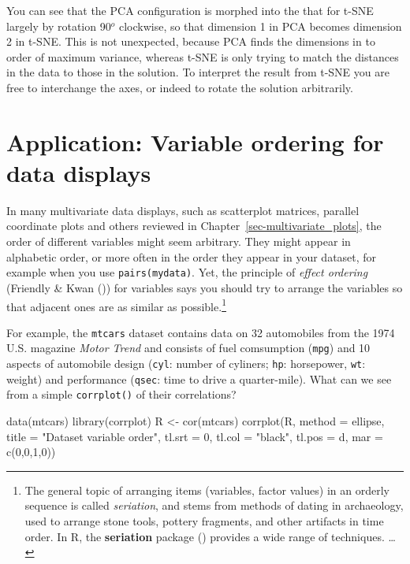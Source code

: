 \documentclass[
  letterpaper,
  10pt,
  krantz2]{krantz}
\makeatletter
\newenvironment{Shaded}{\begin{snugshade}}{\end{snugshade}}
\newcommand{\AttributeTok}[1]{\textcolor[rgb]{0.40,0.45,0.13}{#1}}
\newcommand{\DecValTok}[1]{\textcolor[rgb]{0.68,0.00,0.00}{#1}}
\newcommand{\FunctionTok}[1]{\textcolor[rgb]{0.28,0.35,0.67}{#1}}
\newcommand{\NormalTok}[1]{\textcolor[rgb]{0.00,0.23,0.31}{#1}}
\newcommand{\OtherTok}[1]{\textcolor[rgb]{0.00,0.23,0.31}{#1}}
\newcommand{\StringTok}[1]{\textcolor[rgb]{0.13,0.47,0.30}{#1}}
\newenvironment{kframe}{%
  \medskip{}
  \setlength{\fboxsep}{.8em}
  \def\at@end@of@kframe{}%
  \ifinner\ifhmode%
  \def\at@end@of@kframe{\end{minipage}}%
  \begin{minipage}{\columnwidth}%
  \fi\fi%
  \def\FrameCommand##1{\hskip\@totalleftmargin \hskip-\fboxsep
  \colorbox{shadecolor}{##1}\hskip-\fboxsep
      \hskip-\linewidth \hskip-\@totalleftmargin \hskip\columnwidth}%
  \MakeFramed {\advance\hsize-\width
    \@totalleftmargin\z@ \linewidth\hsize
    \@setminipage}}%
{\par\unskip\endMakeFramed%
  \at@end@of@kframe}
\renewenvironment{Shaded}{\begin{kframe}}{\end{kframe}}
\makeatother
\begin{document}
You can see that the PCA configuration is morphed into the that for
t-SNE largely by rotation 90\(^o\) clockwise, so that dimension 1 in PCA
becomes dimension 2 in t-SNE. This is not unexpected, because PCA finds
the dimensions in to order of maximum variance, whereas t-SNE is only
trying to match the distances in the data to those in the solution. To
interpret the result from t-SNE you are free to interchange the axes, or
indeed to rotate the solution arbitrarily.

\section{Application: Variable ordering for data
displays}\label{sec-var-order}

In many multivariate data displays, such as scatterplot matrices,
parallel coordinate plots and others reviewed in
Chapter~\ref{sec-multivariate_plots}, the order of different variables
might seem arbitrary. They might appear in alphabetic order, or more
often in the order they appear in your dataset, for example when you use
\texttt{pairs(mydata)}. Yet, the principle of \emph{effect ordering}
(Friendly \& Kwan ()) for
variables says you should try to arrange the variables so that adjacent
ones are as similar as possible.\footnote{The general topic of arranging
  items (variables, factor values) in an orderly sequence is called
  \emph{seriation}, and stems from methods of dating in archaeology,
  used to arrange stone tools, pottery fragments, and other artifacts in
  time order. In R, the \textbf{seriation} package
  () provides a wide
  range of techniques. \ldots{}}

For example, the \texttt{mtcars} dataset contains data on 32 automobiles
from the 1974 U.S. magazine \emph{Motor Trend} and consists of fuel
comsumption (\texttt{mpg}) and 10 aspects of automobile design
(\texttt{cyl}: number of cyliners; \texttt{hp}: horsepower, \texttt{wt}:
weight) and performance (\texttt{qsec}: time to drive a quarter-mile).
What can we see from a simple \texttt{corrplot()} of their correlations?

\begin{Shaded}
\begin{Highlighting}[]
\FunctionTok{data}\NormalTok{(mtcars)}
\FunctionTok{library}\NormalTok{(corrplot)}
\NormalTok{R }\OtherTok{\textless{}{-}} \FunctionTok{cor}\NormalTok{(mtcars)}
\FunctionTok{corrplot}\NormalTok{(R, }
         \AttributeTok{method =} \StringTok{\textquotesingle{}ellipse\textquotesingle{}}\NormalTok{,}
         \AttributeTok{title =} \StringTok{"Dataset variable order"}\NormalTok{,}
         \AttributeTok{tl.srt =} \DecValTok{0}\NormalTok{, }\AttributeTok{tl.col =} \StringTok{"black"}\NormalTok{, }\AttributeTok{tl.pos =} \StringTok{\textquotesingle{}d\textquotesingle{}}\NormalTok{,}
         \AttributeTok{mar =} \FunctionTok{c}\NormalTok{(}\DecValTok{0}\NormalTok{,}\DecValTok{0}\NormalTok{,}\DecValTok{1}\NormalTok{,}\DecValTok{0}\NormalTok{))}
\end{Highlighting}
\end{Shaded}
\end{document}
